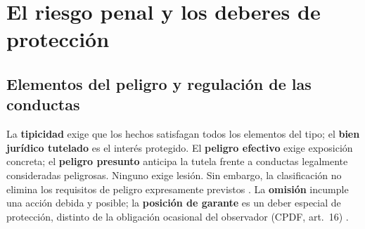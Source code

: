 \documentclass[spanish,letterpaper,oneside]{article}
\begin{document}
\section{El riesgo penal y los deberes de protección}
\subsection*{Elementos del peligro y regulación de las conductas}
La \textbf{tipicidad} exige que los hechos satisfagan todos los elementos del tipo; el \textbf{bien jurídico tutelado} es el interés protegido. El \textbf{peligro efectivo} exige exposición concreta; el \textbf{peligro presunto} anticipa la tutela frente a conductas legalmente consideradas peligrosas. Ninguno exige lesión. Sin embargo, la clasificación no elimina los requisitos de peligro expresamente previstos \citep[p.~279]{amuchateguiPenal2012}. La \textbf{omisión} incumple una acción debida y posible; la \textbf{posición de garante} es un deber especial de protección, distinto de la obligación ocasional del observador (CPDF, art.~16) \citep{cpdfS4Vigente}.
\end{document}
